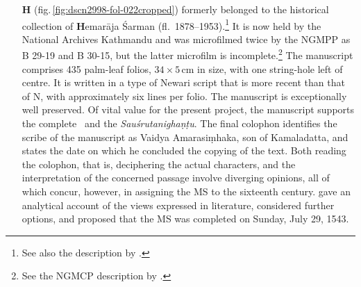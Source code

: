\begin{itemize}
    \goodbreak \item[\textbf{H}]   
    (fig.\,\ref{fig:dscn2998-fol-022cropped}) formerly belonged
to the historical collection of \textbf{H}emarāja Śarman (fl.\
1878--1953).\footnote{See also the description by \citet[\S
    2.3]{kleb-2021b}.} It is
    now held by the National Archives Kathmandu and was microfilmed twice by
    the NGMPP as B 29-19 and B 30-15, but the latter microfilm is
    incomplete.\footnote{ See the NGMCP description by \citet{ak-b29-19}.}
        The manuscript comprises 435 palm-leaf folios, $34\times5$\,cm in size,
        with one string-hole left of centre. It is written in a type of Newari
        script that is more recent than that of N, with approximately six lines
        per folio. The manuscript is exceptionally well preserved.  Of vital
        value for the present project, the manuscript supports the complete \SS\
        and the \emph{Sauśrutanighaṇṭu}. The final colophon identifies the
        scribe of the manuscript as Vaidya Amarasiṃhaka, son of Kamaladatta, and
        states the date on which he concluded the copying of the text. Both
        reading the colophon, that is, deciphering the actual characters, and
        the interpretation of the concerned passage involve diverging opinions,
        all of which concur, however, in assigning the MS to the sixteenth
        century. \textcite[21--26]{kleb-2021b} gave an analytical account of the
        views expressed in literature, considered further options, and proposed
        that the MS was completed on Sunday, July 29, 1543.
\end{itemize}
%  

